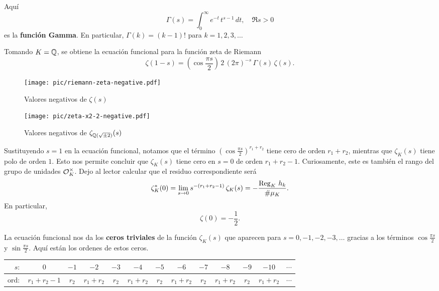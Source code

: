 Aquí
$$\Gamma (s) = \int_0^\infty e^{-t}\,t^{s-1}\,dt, \quad \Re s > 0$$
es la \textbf{función Gamma}. En particular, $\Gamma (k) = (k-1)!$ para $k = 1,2,3,\ldots$

Tomando $K = \mathbb{Q}$, se obtiene la ecuación funcional para la función zeta de
Riemann
$$\zeta (1-s) = \left(\cos\frac{\pi s}{2}\right)\,2\,(2\pi)^{-s}\,\Gamma (s)\,\zeta (s).$$

\begin{figure}
  \begin{center}
    \texttt{[image: pic/riemann-zeta-negative.pdf]}
  \end{center}

  \caption{Valores negativos de $\zeta (s)$}
\end{figure}

\begin{figure}
  \begin{center}
    \texttt{[image: pic/zeta-x2-2-negative.pdf]}
  \end{center}

  \caption{Valores negativos de $\zeta_{\mathbb{Q} (\sqrt{\pm 2})} (s)$}
\end{figure}

Sustituyendo $s = 1$ en la ecuación funcional, notamos que el término
$\left(\cos\frac{\pi s}{2}\right)^{r_1+r_2}$ tiene cero de orden $r_1 + r_2$,
mientras que $\zeta_K (s)$ tiene polo de orden $1$. Esto nos permite concluir
que $\zeta_K (s)$ tiene cero en $s = 0$ de orden $r_1 + r_2 - 1$. Curiosamente,
este es también el rango del grupo de unidades $\mathcal{O}_K^\times$. Dejo al lector
calcular que el residuo correspondiente será
$$\zeta_K^* (0) = \lim_{s \to 0} s^{-(r_1 + r_2 - 1)}\,\zeta_K (s) = -\frac{\operatorname{Reg}_K\,h_k}{\# \mu_K}.$$
En particular,
$$\zeta (0) = -\frac{1}{2}.$$

La ecuación funcional nos da los \textbf{ceros triviales} de la función
$\zeta_K (s)$ que aparecen para $s = 0,-1,-2,-3,\ldots$ gracias a los términos
$\cos \frac{\pi s}{2}$ y $\sin \frac{\pi s}{2}$. Aquí están los ordenes de estos
ceros.

\begin{center}
  \renewcommand{\arraystretch}{1.5}
  \begin{tabular}{rcccccccccccc}
    \hline
    $s\colon$ & $0$ & $-1$ & $-2$ & $-3$ & $-4$ & $-5$ & $-6$ & $-7$ & $-8$ & $-9$ & $-10$ & $\cdots$ \\
    \hline
    $\text{ord}\colon$ & $r_1 + r_2 - 1$ & $r_2$ & $r_1 + r_2$ & $r_2$ & $r_1 + r_2$ & $r_2$ & $r_1 + r_2$ & $r_2$ & $r_1 + r_2$ & $r_2$ & $r_1 + r_2$ & $\cdots$ \\
    \hline
  \end{tabular}
\end{center}

